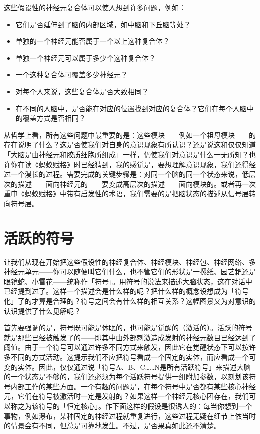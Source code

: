 \documentclass[
  12pt,
  twoside,
  openright,
  oldfontcommands,
]{memoir}
\providecommand{\tightlist}{%
  \setlength{\itemsep}{0pt}\setlength{\parskip}{0pt}}
\begin{document}
这些假设性的神经元复合体可以使人想到许多问题，例如：

\begin{itemize}
\tightlist
\item
  它们是否延伸到了脑的内部区域，如中脑和下丘脑等处？
\item
  单独的一个神经元能否属于一个以上这种复合体？
\item
  单独一个神经元可以属于多少个这种复合体？
\item
  一个这种复合体可覆盖多少神经元？
\item
  对每个人来说，这些复合体是否大致相同？
\item
  在不同的人脑中，是否能在对应的位置找到对应的复合体？它们在每个人脑中的覆盖方式是否相同？
\end{itemize}

从哲学上看，所有这些问题中最重要的是：这些模块------例如一个祖母模块------的存在说明了什么？这是否使我们对自身的意识现象有所认识？还是说这和仅仅知道「大脑是由神经元和胶质细胞所组成」一样，仍使我们对意识是什么一无所知？也许你在读《蚂蚁赋格》时已经猜到，我的感觉是，要想理解意识现象，我们还得经过一个漫长的过程。需要完成的关键步骤是：对同一个脑的同一个状态来说，低层次的描述------面向神经元的------要变成高层次的描述------面向模块的。或者再一次重申《蚂蚁赋格》中带有启发性的术语，我们需要的是把脑状态的描述从信号层转向符号层。

\section{活跃的符号}

让我们从现在开始把这些假设性的神经复合体、神经模块、神经包、神经网络、多神经元单元------你可以随便叫它们什么，也不管它们的形状是一摞纸、园艺耙还是眼镜蛇、小雪花------统称作「符号」。用符号的说法来描述大脑状态，这在对话中已经提到过了。这样一个描述会是什么样的呢？把什么样的概念设想成为「符号化」了的才算是合理的？符号之间会有什么样的相互关系？这幅图景又为对意识的认识提供了什么见解呢？

首先要强调的是，符号既可能是休眠的，也可能是觉醒的（激活的）。活跃的符号就是那些已经被触发了的------即其中由外部刺激造成发射的神经元数目已经达到了阈值。由于一个符号可以通过许多不同方式来触发，因此它在觉醒状态下可以按许多不同的方式活动。这提示我们不应把符号看成一个固定的实体，而应看成一个可变的实体。因此，仅仅通过说「符号A、B、C\ldots\ldots N是所有活跃符号」来描述大脑的一个状态是不够的，我们还必须为每个活跃符号提供一组附加参数，以刻划该符号内部工作的某些方面。一个有趣的问题是，在每个符号中是否都有某些核心神经元，它们在符号被激活时一定是发射的？如果这样一个神经元核心团存在，我们可以称之为该符号的「恒定核心」。作下面这样的假设是很诱人的：每当你想到一个事物，例如瀑布，某种固定的神经过程就重复进行，这些过程无疑在细节上依当时的情景会有不同，但总是可靠地发生。不过，是否果真如此还不清楚。
\end{document}
